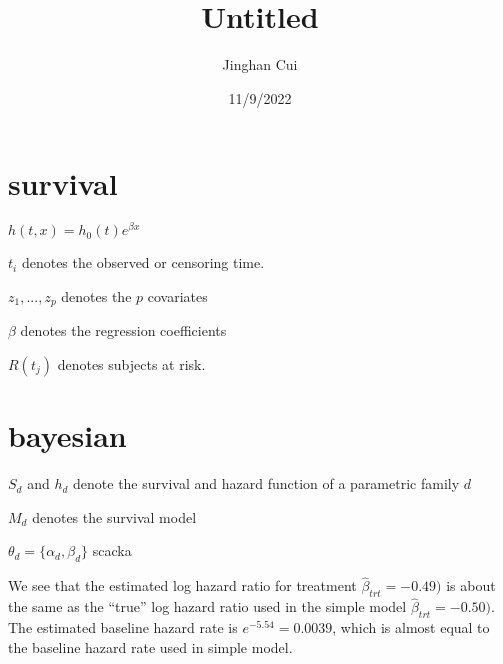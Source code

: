 \documentclass[
]{article}
\title{Untitled}
\author{Jinghan Cui}
\date{11/9/2022}
\begin{document}
\maketitle

\hypertarget{survival}{%
\section{survival}\label{survival}}

\(h(t,x)=h_0(t)e^{{\beta}x}\)

\(t_i\) denotes the observed or censoring time.

\(z_1,...,z_p\) denotes the \(p\) covariates

\(\beta\) denotes the regression coefficients

\(R(t_j)\) denotes subjects at risk.

\hypertarget{bayesian}{%
\section{bayesian}\label{bayesian}}

\(S_d\) and \(h_d\) denote the survival and hazard function of a
parametric family \(d\)

\(M_d\) denotes the survival model

\(\theta_d = \{\alpha_d,\beta_d\}\) scacka

We see that the estimated log hazard ratio for treatment
\(\hat\beta_{trt} = -0.49)\) is about the same as the ``true'' log
hazard ratio used in the simple model \(\hat\beta_{trt} = -0.50)\). The
estimated baseline hazard rate is \(e^{−5.54} = 0.0039\), which is
almost equal to the baseline hazard rate used in simple model.
\end{document}
